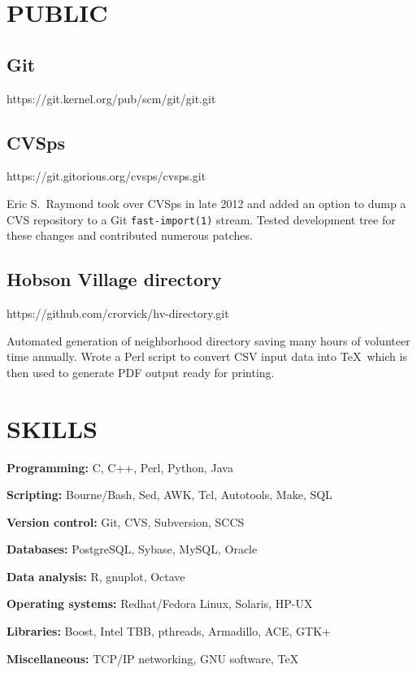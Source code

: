 \section{PUBLIC}{%
\parskip=3pt
\subsection{Git}        {\tb https://git.kernel.org/pub/scm/git/git.git}




\vskip 8pt

\subsection{CVSps}       {\tb https://git.gitorious.org/cvsps/cvsps.git}

Eric S.\ Raymond took over CVSps in late 2012 and added an option to
dump a CVS repository to a Git {\tt fast-import(1)} stream.  Tested
development tree for these changes and contributed numerous patches.

\vskip 8pt

\subsection{Hobson Village directory}
                      {\tb https://github.com/crorvick/hv-directory.git}

Automated generation of neighborhood directory saving many hours of
volunteer time annually.  Wrote a Perl script to convert CSV input data
into \TeX\ which is then used to generate PDF output ready for printing.
}

\section{SKILLS}{%
{\bf Programming:} C, C++, Perl, Python, Java

{\bf Scripting:} Bourne/Bash, Sed, AWK, Tcl, Autotools, Make, SQL

{\bf Version control:} Git, CVS, Subversion, SCCS

{\bf Databases:} PostgreSQL, Sybase, MySQL, Oracle

{\bf Data analysis:} R, gnuplot, Octave

{\bf Operating systems:} Redhat/Fedora Linux, Solaris, HP-UX

{\bf Libraries:} Boost, Intel TBB, pthreads, Armadillo, ACE, GTK+

{\bf Miscellaneous:} TCP/IP networking, GNU software, \TeX
}

